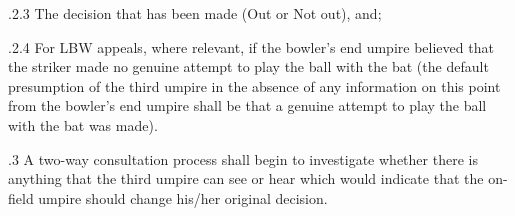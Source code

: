 \documentclass[12pt]{article}
\begin{document}
\vspace{\baselineskip}
\begin{adjustwidth}{0.49in}{0.0in}
{\fontsize{9pt}{10.8pt}.2.3 \tabto{1.17in} The decision that has been made (Out or Not out), and;\par}\par

\end{adjustwidth}


\vspace{\baselineskip}
\begin{adjustwidth}{1.18in}{0.12in}
\begin{justify}
{\fontsize{9pt}{10.8pt}.2.4 \tabto{1.17in} For LBW appeals, where relevant, if the bowler’s end umpire believed that the striker made no genuine attempt to play the ball with the bat (the default presumption of the third umpire in the absence of any information on this point from the bowler’s end umpire shall be that a genuine attempt to play the ball with the bat was made).\par}
\end{justify}\par

\end{adjustwidth}


\vspace{\baselineskip}
\begin{adjustwidth}{0.5in}{0.03in}
{\fontsize{9pt}{10.8pt}.3 \tabto{0.49in} A two-way consultation process shall begin to investigate whether there is anything that the third umpire can see or hear which would indicate that the on-field umpire should change his/her original decision.\par}\par

\end{adjustwidth}


\vspace{\baselineskip}

\vspace{\baselineskip}

\vspace{\baselineskip}

\vspace{\baselineskip}

\vspace{\baselineskip}

\vspace{\baselineskip}
\begin{Center}
{\fontsize{8pt}{9.6pt}\par}
\end{Center}\par
\end{document}
